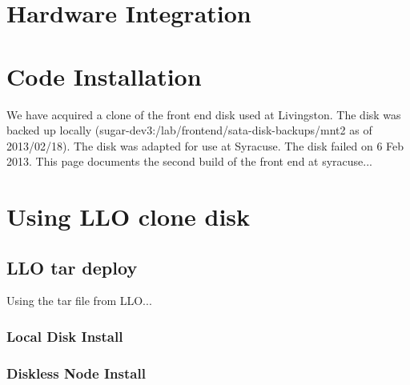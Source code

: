 \section{Hardware Integration}

\section{Code Installation}

We have acquired a clone of the front end disk used at Livingston. The disk was backed up locally (sugar-dev3:/lab/frontend/sata-disk-backups/mnt2 as of 2013/02/18). The disk was adapted for use at Syracuse. The disk failed on 6 Feb 2013. This page documents the second build of the front end at syracuse...




\section{Using LLO clone disk}
\subsection{LLO tar deploy}

Using the tar file from LLO...

\subsubsection{Local Disk Install}

\subsubsection{Diskless Node Install}

